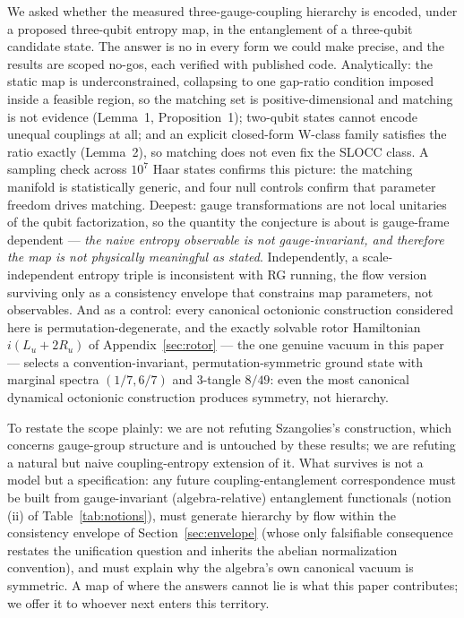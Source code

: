 \documentclass[11pt]{article}
\begin{document}
We asked whether the measured three-gauge-coupling hierarchy is encoded, under a proposed three-qubit entropy map, in the entanglement of a three-qubit candidate state. The answer is no in every form we could make precise, and the results are scoped no-gos, each verified with published code. Analytically: the static map is underconstrained, collapsing to one gap-ratio condition imposed inside a feasible region, so the matching set is positive-dimensional and matching is not evidence (Lemma~1, Proposition~1); two-qubit states cannot encode unequal couplings at all; and an explicit closed-form W-class family satisfies the ratio exactly (Lemma~2), so matching does not even fix the SLOCC class. A sampling check across $10^7$ Haar states confirms this picture: the matching manifold is statistically generic, and four null controls confirm that parameter freedom drives matching. Deepest: gauge transformations are not local unitaries of the qubit factorization, so the quantity the conjecture is about is gauge-frame dependent --- \emph{the naive entropy observable is not gauge-invariant, and therefore the map is not physically meaningful as stated}. Independently, a scale-independent entropy triple is inconsistent with RG running, the flow version surviving only as a consistency envelope that constrains map parameters, not observables. And as a control: every canonical octonionic construction considered here is permutation-degenerate, and the exactly solvable rotor Hamiltonian $i(L_u + 2R_u)$ of Appendix~\ref{sec:rotor} --- the one genuine vacuum in this paper --- selects a convention-invariant, permutation-symmetric ground state with marginal spectra $(1/7, 6/7)$ and 3-tangle $8/49$: even the most canonical dynamical octonionic construction produces symmetry, not hierarchy.

To restate the scope plainly: we are not refuting Szangolies's construction, which concerns gauge-group structure and is untouched by these results; we are refuting a natural but naive coupling-entropy extension of it. What survives is not a model but a specification: any future coupling-entanglement correspondence must be built from gauge-invariant (algebra-relative) entanglement functionals (notion (ii) of Table~\ref{tab:notions}), must generate hierarchy by flow within the consistency envelope of Section~\ref{sec:envelope} (whose only falsifiable consequence restates the unification question and inherits the abelian normalization convention), and must explain why the algebra's own canonical vacuum is symmetric. A map of where the answers cannot lie is what this paper contributes; we offer it to whoever next enters this territory.
\end{document}
